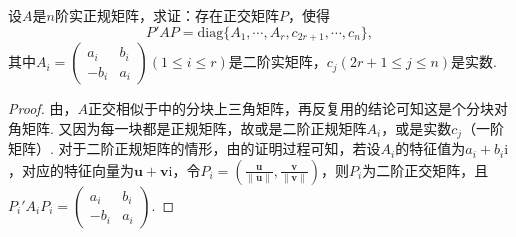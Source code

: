 \documentclass[../../main.tex]{subfiles}%
\begin{document}
\begin{proposition}\label{proposition:例9.90}
设\(A\)是\(n\)阶实正规矩阵，求证：存在正交矩阵\(P\)，使得
\[
P'AP = \mathrm{diag}\{A_1,\cdots,A_r,c_{2r + 1},\cdots,c_n\},
\]
其中\(A_i=\begin{pmatrix}a_i&b_i\\-b_i&a_i\end{pmatrix}(1\leqslant  i\leqslant  r)\)是二阶实矩阵，\(c_j(2r + 1\leqslant  j\leqslant  n)\)是实数.
\end{proposition}
\begin{proof}

由，\(A\)正交相似于中的分块上三角矩阵，再反复用的结论可知这是个分块对角矩阵. 又因为每一块都是正规矩阵，故或是二阶正规矩阵\(A_i\)，或是实数\(c_j\)（一阶矩阵）. 对于二阶正规矩阵的情形，由的证明过程可知，若设\(A_i\)的特征值为\(a_i + b_i\mathrm{i}\)，对应的特征向量为\(\boldsymbol{u}+ \boldsymbol{v}\mathrm{i}\)，令\(P_i = (\frac{\boldsymbol{u}}{\|\boldsymbol{u}\|},\frac{\boldsymbol{v}}{\|\boldsymbol{v}\|})\)，则\(P_i\)为二阶正交矩阵，且\(P_i'A_iP_i=\begin{pmatrix}a_i&b_i\\-b_i&a_i\end{pmatrix}\). 

\end{proof}
\end{document}
